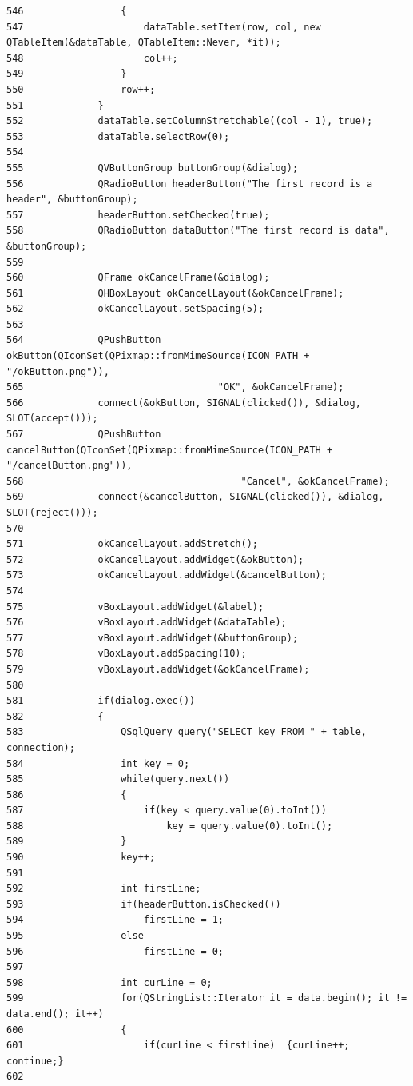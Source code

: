 \begin{verbatim}
546                 {
547                     dataTable.setItem(row, col, new QTableItem(&dataTable, QTableItem::Never, *it));
548                     col++;
549                 }
550                 row++;
551             }
552             dataTable.setColumnStretchable((col - 1), true);
553             dataTable.selectRow(0);
554             
555             QVButtonGroup buttonGroup(&dialog);
556             QRadioButton headerButton("The first record is a header", &buttonGroup);
557             headerButton.setChecked(true);
558             QRadioButton dataButton("The first record is data", &buttonGroup);
559         
560             QFrame okCancelFrame(&dialog);
561             QHBoxLayout okCancelLayout(&okCancelFrame);
562             okCancelLayout.setSpacing(5);
563         
564             QPushButton okButton(QIconSet(QPixmap::fromMimeSource(ICON_PATH + "/okButton.png")),
565                                  "OK", &okCancelFrame);
566             connect(&okButton, SIGNAL(clicked()), &dialog, SLOT(accept()));
567             QPushButton cancelButton(QIconSet(QPixmap::fromMimeSource(ICON_PATH + "/cancelButton.png")),
568                                      "Cancel", &okCancelFrame);
569             connect(&cancelButton, SIGNAL(clicked()), &dialog, SLOT(reject()));
570             
571             okCancelLayout.addStretch();
572             okCancelLayout.addWidget(&okButton);
573             okCancelLayout.addWidget(&cancelButton);
574         
575             vBoxLayout.addWidget(&label);
576             vBoxLayout.addWidget(&dataTable);
577             vBoxLayout.addWidget(&buttonGroup);
578             vBoxLayout.addSpacing(10);
579             vBoxLayout.addWidget(&okCancelFrame);
580             
581             if(dialog.exec())
582             {
583                 QSqlQuery query("SELECT key FROM " + table, connection);
584                 int key = 0;
585                 while(query.next())
586                 {
587                     if(key < query.value(0).toInt())
588                         key = query.value(0).toInt();
589                 }
590                 key++;
591                 
592                 int firstLine;
593                 if(headerButton.isChecked())
594                     firstLine = 1;
595                 else
596                     firstLine = 0;
597                 
598                 int curLine = 0;
599                 for(QStringList::Iterator it = data.begin(); it != data.end(); it++)
600                 {
601                     if(curLine < firstLine)  {curLine++; continue;}
602                     

\end{verbatim}
